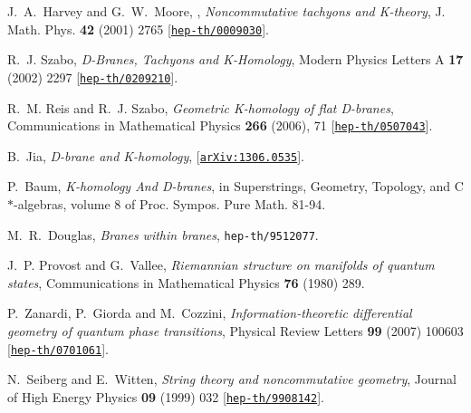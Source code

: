\documentclass[12pt]{article}
\numberwithin{equation}{section}
\begin{document}
\begin{thebibliography}{10}
{
J.~A.~Harvey and G.~W.~Moore, , {\it {Noncommutative tachyons and K-theory}},  J. Math. Phys. {\bf 42}
(2001) 2765 [\href{http://arXiv.org/abs/0009030}{{\tt hep-th/0009030}}].}

R.~J. Szabo, {\it {D-Branes, Tachyons and K-Homology}},  { Modern Physics
  Letters A} {\bf 17} (2002) 2297
  [\href{http://arXiv.org/abs/0209210}{{\tt hep-th/0209210}}].

R.~M. Reis and R.~J. Szabo, {\it {Geometric K-homology of flat D-branes}},
  { Communications in Mathematical Physics} {\bf 266} (2006), 71
  [\href{http://arXiv.org/abs/0507043}{{\tt hep-th/0507043}}].

{
B.~Jia, {\it {D-brane and K-homology}}, [\href{http://arXiv.org/abs/arXiv:1306.0535v1}{{\tt arXiv:1306.0535}}].}

{
P.~Baum, {\it {K-homology And D-branes}}, in Superstrings, Geometry, Topology, and C$\ast$-algebras, volume 8 of Proc. Sympos. Pure Math. 81-94.}

 M.~R.~Douglas, {\it Branes within branes},
{\tt hep-th/9512077}.

J.~P. Provost and G.~Vallee, {\it {Riemannian structure on manifolds of quantum
  states}},  { Communications in Mathematical Physics} {\bf 76} (1980)
  289.

P.~Zanardi, P.~Giorda and M.~Cozzini, {\it {Information-theoretic differential
  geometry of quantum phase transitions}},  { Physical Review Letters} {\bf
  99} (2007) 100603 [\href{http://arXiv.org/abs/0701061}{{\tt hep-th/0701061}}].

{
N.~Seiberg and E.~Witten, {\it {String theory and noncommutative geometry}},  { Journal of High Energy Physics} {\bf 09} (1999) 032
  [\href{http://arXiv.org/abs/9908142}{{\tt hep-th/9908142}}].}


\end{thebibliography}\endgroup
\end{document}
